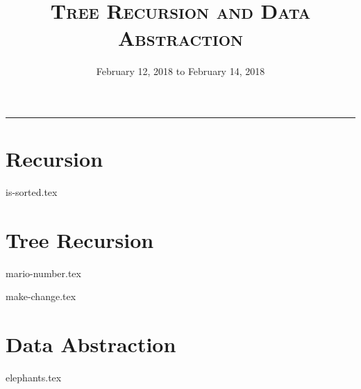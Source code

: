 \documentclass{exam}
\title{\textsc{Tree Recursion and Data Abstraction}}
\date{February 12, 2018 to February 14, 2018}
\begin{document}
\maketitle
\rule{\textwidth}{0.15em}
\fontsize{12}{15}\selectfont


\section{Recursion}
\begin{questions}
{is-sorted.tex}
\end{questions}

\section{Tree Recursion}
\begin{questions}
{mario-number.tex}

{make-change.tex}
\end{questions}


\section{Data Abstraction}
\begin{questions}
{elephants.tex}
\end{questions}
\end{document}
